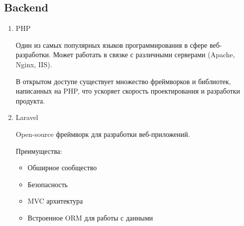 \documentclass[./tools.tex]{subfiles}
\begin{document}
  \subsection{Backend}
  \begin{enumerate}
    \item PHP\\
    \par
    Один из самых популярных языков программирования в сфере веб-разработки. Может работать в связке с различными серверами (Apache, Nginx, IIS).
    \par
    В открытом доступе существует множество фреймворков и библиотек, написанных на PHP, что ускоряет скорость проектирования и разработки продукта.
    \item Laravel\\
    \par
    Open-source фреймворк для разработки веб-приложений.
    \par
    Преимущества:
    \begin{itemize}
      \item Обширное сообщество
      \item Безопасность
      \item MVC архитектура
      \item Встроенное ORM для работы с данными
    \end{itemize}
  \end{enumerate}
\end{document}
